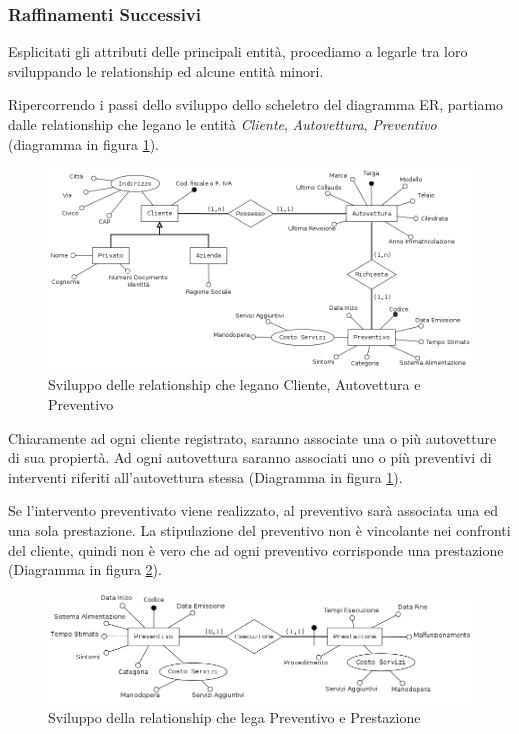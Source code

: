 		\subsubsection{Raffinamenti Successivi}
			
			Esplicitati gli attributi delle principali entità, procediamo a legarle tra loro sviluppando le relationship ed alcune entità minori.
			
			Ripercorrendo i passi dello sviluppo dello scheletro del diagramma ER, partiamo dalle relationship che legano le entità \emph{Cliente}, \emph{Autovettura}, \emph{Preventivo} (diagramma in figura \ref{fig:cliente_autovettura_preventivo}).		
		
			\begin{figure}
				\centering
				\includegraphics[width=13cm]{images/finitures/cliente_autovettura_preventivo.png}
				\caption{Sviluppo delle relationship che legano Cliente, Autovettura e Preventivo}
				\label{fig:cliente_autovettura_preventivo}
			\end{figure}
			
			Chiaramente ad ogni cliente registrato, saranno associate una o più autovetture di sua propiertà. Ad ogni autovettura saranno associati uno o più preventivi di interventi riferiti all'autovettura stessa (Diagramma in figura \ref{fig:cliente_autovettura_preventivo}).
			
			Se l'intervento preventivato viene realizzato, al preventivo sarà associata una ed una sola prestazione. La stipulazione del preventivo non è vincolante nei confronti del cliente, quindi non è vero che ad ogni preventivo corrisponde una prestazione (Diagramma in figura \ref{fig:preventivo_prestazione}).
			
			\begin{figure}[H]
				\centering
				\includegraphics[width=13cm]{images/finitures/preventivo_prestazione.png}
				\caption{Sviluppo della relationship che lega Preventivo e Prestazione}
				\label{fig:preventivo_prestazione}
			\end{figure}
			
